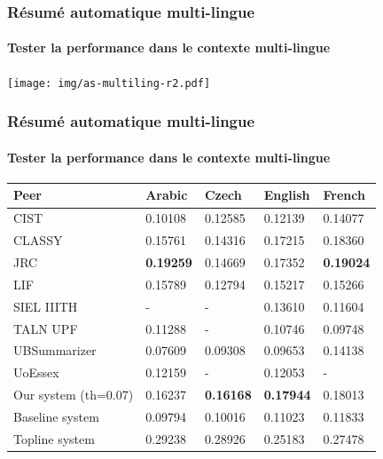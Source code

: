 \documentclass{beamer}
\begin{document}
\begin{frame}
\frametitle{Résumé automatique multi-lingue}
\framesubtitle{Tester la performance dans le contexte multi-lingue}

\begin{center}
\texttt{[image: img/as-multiling-r2.pdf]}
\end{center}

\end{frame}

\begin{frame}
\frametitle{Résumé automatique multi-lingue}
\framesubtitle{Tester la performance dans le contexte multi-lingue}

{\scriptsize
\begin{tabular*}{\textwidth}{@{\extracolsep{\fill}}lllll} 
\hline
\hline
Peer 			& 	Arabic 			& Czech 			& English 			& French			\\
\hline
\hline

CIST			& 0.10108			& 0.12585			& 0.12139			& 0.14077 			\\
CLASSY			& 0.15761			& 0.14316			& 0.17215			& 0.18360 			\\
JRC				& \textbf{0.19259}	& 0.14669			& 0.17352			& \textbf{0.19024} 	\\
LIF				& 0.15789			& 0.12794			& 0.15217			& 0.15266 			\\
SIEL IIITH		& -					& -					& 0.13610			& 0.11604 			\\
TALN UPF		& 0.11288			& -					& 0.10746			& 0.09748 			\\
UBSummarizer	& 0.07609			& 0.09308			& 0.09653			& 0.14138 			\\
UoEssex			& 0.12159			& -					& 0.12053			& - 				\\
\hline
Our system (th=0.07)		& 0.16237			& \textbf{0.16168}	& \textbf{0.17944}	& 0.18013 			\\
\hline
Baseline system	& 0.09794			& 0.10016			& 0.11023			& 0.11833 			\\
Topline system	& 0.29238			& 0.28926			& 0.25183			& 0.27478 			\\
\hline
\hline
\end{tabular*}
 }
\end{frame}
\end{document}

